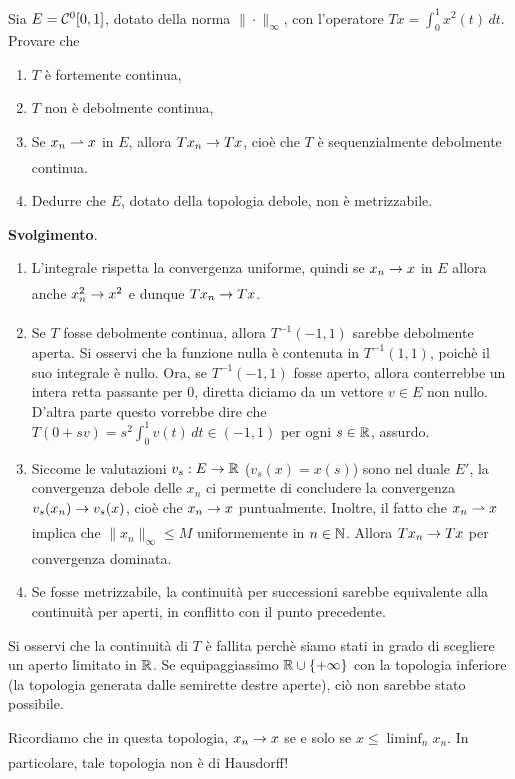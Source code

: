 \begin{exercise}
	Sia $E=\mathcal{C}^0[0,1]$, dotato della norma $\|\cdot\|_\infty$, con l'operatore $Tx = \int_0^1 x^2(t)\,dt$. Provare che
	\begin{enumerate}
		\item $T$ è fortemente continua,
		\item $T$ non è debolmente continua,
		\item Se $x_n \rightharpoonup x$ in $E$, allora $Tx_n \underset{{}}{\rightarrow} Tx$, cioè che $T$ è sequenzialmente debolmente continua.
		\item Dedurre che $E$, dotato della topologia debole, non è metrizzabile.
	\end{enumerate}

	\textbf{Svolgimento}.
	\begin{enumerate}
		\item L'integrale rispetta la convergenza uniforme, quindi se $x_n \underset{{}}{\rightarrow} x$ in $E$ allora anche $x^2_n \underset{{}}{\rightarrow} x^2$ e dunque $Tx_n \underset{{}}{\rightarrow} Tx$.
		\item Se $T$ fosse debolmente continua, allora $T^{-1}(-1,1)$ sarebbe debolmente aperta. Si osservi che la funzione nulla è contenuta in $T^{-1}(1,1)$, poichè il suo integrale è nullo. Ora, se $T^{-1}(-1,1)$ fosse aperto, allora conterrebbe un intera retta passante per $0$, diretta diciamo da un vettore $v \in E$ non nullo. D'altra parte questo vorrebbe dire che $T(0+sv) = s^2 \int_0^1 v(t)\,dt \in (-1,1)$ per ogni $s \in \mathbb{R}$, assurdo.
		\item Siccome le valutazioni $v_s : E \to \mathbb{R}$ ($v_s(x) = x(s)$) sono nel duale $E'$, la convergenza debole delle $x_n$ ci permette di concludere la convergenza $v_s(x_n) \underset{{}}{\rightarrow} v_s(x)$, cioè che $x_n \underset{{}}{\rightarrow} x$ puntualmente. Inoltre, il fatto che $x_n \rightharpoonup x$ implica che $\|x_n\|_\infty \leq M$ uniformemente in $n \in \mathbb{N}$.  Allora $Tx_n \underset{{}}{\rightarrow} Tx$ per convergenza dominata.
		\item Se fosse metrizzabile, la continuità per successioni sarebbe equivalente alla continuità per aperti, in conflitto con il punto precedente.
	\end{enumerate}
\end{exercise}

Si osservi che la continuità di $T$ è fallita perchè siamo stati in grado di scegliere un aperto limitato in $\mathbb{R}$. Se equipaggiassimo $\mathbb{R} \cup \{+\infty\}$ con la topologia inferiore (la topologia generata dalle semirette destre aperte), ciò non sarebbe stato possibile.

Ricordiamo che in questa topologia, $x_n \underset{{}}{\rightarrow} x$ se e solo se $x \leq \liminf_n x_n$. In particolare, tale topologia non è di Hausdorff!

